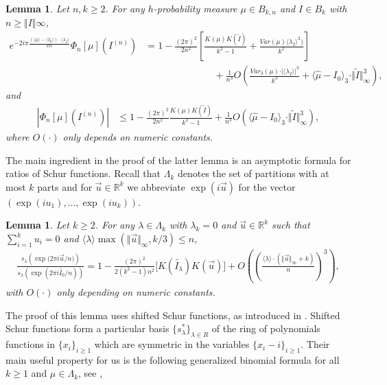 \documentclass[10pt,11pt]{amsart}%
\newtheorem{lemma}[theorem]{Lemma}
\begin{document}
\begin{lemma}\label{lem:asymptoti_eigenvalue}
Let $n,k\geq 2$. For any $h$-probability measure $\mu\in B_{k,n}$ and $I\in B_{k}$ with $n\geq \Vert I\Vert{\infty}$,
\begin{align*}
e^{-2i\pi \frac{(\langle\mu\rangle-\langle I_0\rangle)\cdot\langle \lambda_I\rangle}{kn}}\Phi_{n}[\mu](I^{(n)})&=1-\frac{(2\pi)^2}{2n^2}\left[\frac{K(\mu)K(\tilde{I})}{k^2-1}+\frac{Var(\mu)\langle \lambda_I\rangle^2)}{k^2}\right]\\
&\hspace{3cm}+\frac{1}{n^3}O\left(\frac{Var_3(\mu)\cdot\vert\langle \lambda_I\rangle\vert^3}{k^3}+\langle\hat{\mu}-I_0\rangle_3\cdot\Vert \tilde{I}\Vert_\infty^3\right),
\end{align*}
and 
\begin{align*}
\left\vert \Phi_{n}[\mu](I^{(n)})\right\vert&\leq 1-\frac{(2\pi)^2}{2n^2}\frac{K(\mu)K(\tilde{I})}{k^2-1}+\frac{1}{n^3}O\left(\langle\hat{\mu}-I_0\rangle_3\cdot\Vert \tilde{I}\Vert_\infty^3\right),
\end{align*}
where $O(\cdot)$ only depends on numeric constants.
\end{lemma}
The main ingredient in the proof of the latter lemma is an asymptotic formula for ratios of Schur functions. Recall that $\Lambda_{k}$ denotes the set of partitions with at most $k$ parts and for $\vec{u}\in\mathbb{R}^k$ we abbreviate $\exp(i\vec{u})$ for the vector $(\exp(iu_1),\ldots,\exp(iu_k))$.
\begin{lemma}\label{lem:asymptotic_schur}
Let $k\geq 2$. For any $\lambda\in \Lambda_{k}$ with $\lambda_k=0$ and $\vec{u}\in \mathbb{R}^k$ such that $\sum_{i=1}^ku_i=0$ and $\langle \lambda\rangle \max(\Vert \vec{u}\Vert_\infty,k/3)\leq n$,
\begin{align*}
\frac{s_{\lambda}\left(\exp\Big(2\pi i\vec{u}/n\Big)\right)}{s_{\lambda}\left(\exp\left(2\pi i \widetilde{I_0}/n\right)\right)}=1-\frac{(2\pi)^2}{2(k^2-1)n^2}\Big[K(\widetilde{I_{\lambda}})K(\vec{u})\Big]+O\left(\left(\frac{\langle \lambda\rangle\cdot (\Vert \vec{u}\Vert_\infty+k)}{n}\right)^3\right),
\end{align*}
with $O(\cdot)$ only depending on numeric constants.
\end{lemma}
The proof of this lemma uses shifted Schur functions, as introduced in \cite{OkOl}. Shifted Schur functions form a particular basis $\{s_{\lambda}^*\}_{\lambda\in R}$ of the ring of polynomials functions in $\{x_i\}_{i\geq 1}$ which are symmetric in the variables $\{x_i-i\}_{i\geq 1}$. Their main useful property for us is the following generalized binomial formula for all $k\geq 1$ and $\mu\in \Lambda_{k}$, see \cite[Sec. 5]{OkOl},
\end{document}
